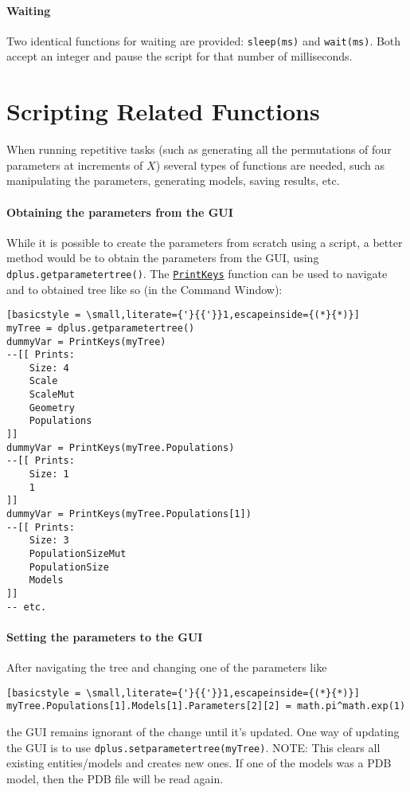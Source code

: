 \documentclass[../D+Manual.tex]{subfiles}
\begin{document}
\paragraph{Waiting}
Two identical functions for waiting are provided: \lstinline{sleep(ms)} and \lstinline{wait(ms)}. Both accept an integer and pause the script for that number of milliseconds.


\section{Scripting Related Functions}

When running repetitive tasks (such as generating all the permutations of four parameters at increments of $X$) several types of functions are needed, such as manipulating the parameters, generating models, saving results, etc.

\paragraph{Obtaining the parameters from the GUI}
\begin{sloppypar}
While it is possible to create the parameters from scratch using a script, 
a better method would be to obtain the parameters from the GUI, using  \lstinline{dplus.getparametertree()}. The \hyperref[sec:par:printKeys]{\texttt{PrintKeys}} function can be used to navigate and to obtained tree like so (in the Command Window):
\end{sloppypar}

\begin{lstlisting}[basicstyle = \small,literate={'}{{'}}1,escapeinside={(*}{*)}]
myTree = dplus.getparametertree()
dummyVar = PrintKeys(myTree)
--[[ Prints:
	Size: 4
	Scale
	ScaleMut
	Geometry
	Populations
]]
dummyVar = PrintKeys(myTree.Populations)
--[[ Prints:
	Size: 1
	1
]]
dummyVar = PrintKeys(myTree.Populations[1])
--[[ Prints:
	Size: 3
	PopulationSizeMut
	PopulationSize
	Models
]]
-- etc.
\end{lstlisting}

\paragraph{Setting the parameters to the GUI}
After navigating the tree and changing one of the parameters like
\begin{lstlisting}[basicstyle = \small,literate={'}{{'}}1,escapeinside={(*}{*)}]
myTree.Populations[1].Models[1].Parameters[2][2] = math.pi^math.exp(1)
\end{lstlisting}
the GUI remains ignorant of the change until it's updated.
One way of updating the GUI is to use
\lstinline{dplus.setparametertree(myTree)}.
NOTE: This clears all existing entities/models and creates new ones. If one of the models was a PDB model, then the PDB file will be read again.
\end{document}
